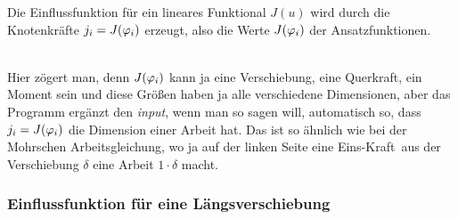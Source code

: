 \hspace*{-12pt}\colorbox{highlightBlue}{\parbox{0.98\textwidth}{
 Die Einflussfunktion f\"{u}r ein lineares Funktional $J(u)$ wird durch die Knotenkr\"{a}fte $j_i = J(\varphi_i)$ erzeugt, also die Werte $J(\varphi_i)$ der Ansatzfunktionen.}}\\

Hier z\"{o}gert man, denn $J(\varphi_i) $ kann ja eine Verschiebung, eine Querkraft, ein Moment sein und diese Gr\"{o}{\ss}en haben ja alle verschiedene Dimensionen, aber das Programm erg\"{a}nzt den {\em input\/}, wenn man so sagen will, automatisch so, dass $j_i = J(\varphi_i)$ die Dimension einer Arbeit hat. Das ist so \"{a}hnlich wie bei der Mohrschen Arbeitsgleichung, wo ja auf der linken Seite eine \glq Eins-Kraft\grq\ aus der Verschiebung $\delta$ eine Arbeit $1 \cdot \delta$ macht.

{\textcolor{sectionTitleBlue}{\subsubsection*{Einflussfunktion f\"{u}r eine L\"{a}ngsverschiebung}}}

